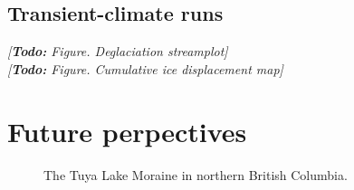 \documentclass{article}
\newcommand{\todo}[1]{\emph{[\textbf{Todo:} #1]}}
\begin{document}
\subsection{Transient-climate runs}
\todo{Figure. Deglaciation streamplot}\\
\todo{Figure. Cumulative ice displacement map}

\section{Future perpectives}

\begin{figure}
  \centering
  \caption{The Tuya Lake Moraine in northern British Columbia.}
  \label{fig:photo-tuya-moraine}
\end{figure}

\newcommand{\urlprefix}[0]{}  %



\end{document}
